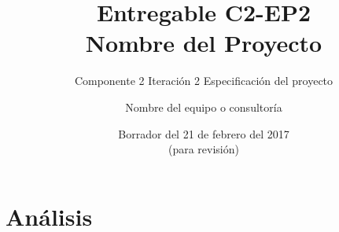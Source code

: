 \documentclass[10pt]{book}
\title{Entregable C2-EP2\bigskip\\Nombre del Proyecto}
\subtitle{Componente 2 Iteración 2 Especificación del proyecto}
\author{Nombre del equipo o consultoría}
\date{\color{red}Borrador del 21 de febrero del 2017\\(para revisión)}
\begin{document}
\maketitle
\thispagestyle{empty}


\frontmatter
\tableofcontents
\listoffigures 
\listoftables

% 

\mainmatter 


\chapter{Análisis}

%
















\end{document}
